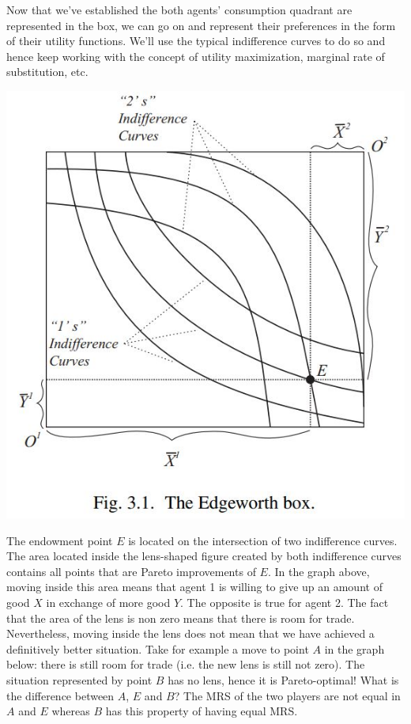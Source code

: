 \documentclass[12pt]{report}
\begin{document}
Now that we've established the both agents' consumption quadrant are represented in the box, we can go on and represent their preferences in the form of their utility functions. We'll use the typical indifference curves to do so and hence keep working with the concept of utility maximization, marginal rate of substitution, etc. \begin{center}
\includegraphics[scale=0.45]{images/edge02}
\end{center}

The endowment point $E$ is located on the intersection of two indifference curves. The area located inside the lens-shaped figure created by both indifference curves contains all points that are Pareto improvements of $E$. In the graph above, moving inside this area means that agent 1 is willing to give up an amount of good $X$ in exchange of more good $Y$. The opposite is true for agent 2. The fact that the area of the lens is non zero means that there is room for trade. Nevertheless, moving inside the lens does not mean that we have achieved a definitively better situation. Take for example a move to point $A$ in the graph below: there is still room for trade (i.e. the new lens is still not zero). The situation represented by point $B$ has no lens, hence it is Pareto-optimal! What is the difference between $A$, $E$ and $B$? The MRS of the two players are not equal in $A$ and $E$ whereas $B$ has this property of having equal MRS.
\end{document}
